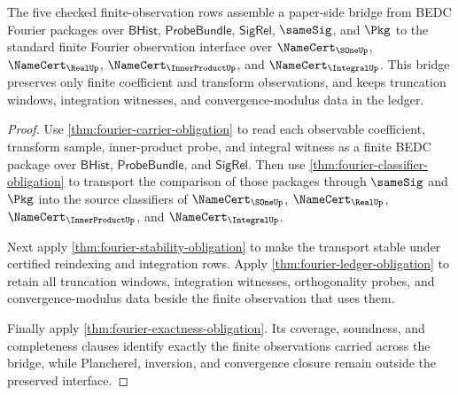 \begin{theorem}\label{thm:fourier-finite-observation-standard-bridge}
The five checked finite-observation rows assemble a paper-side bridge from BEDC Fourier packages over $\mathsf{BHist}$, $\mathsf{ProbeBundle}$, $\mathsf{SigRel}$, $\sameSig$, and $\Pkg$ to the standard finite Fourier observation interface over $\NameCert_{\SOneUp}$, $\NameCert_{\RealUp}$, $\NameCert_{\InnerProductUp}$, and $\NameCert_{\IntegralUp}$. This bridge preserves only finite coefficient and transform observations, and keeps truncation windows, integration witnesses, and convergence-modulus data in the ledger.
\end{theorem}
\begin{proof}
Use \autoref{thm:fourier-carrier-obligation} to read each observable coefficient, transform sample, inner-product probe, and integral witness as a finite BEDC package over $\mathsf{BHist}$, $\mathsf{ProbeBundle}$, and $\mathsf{SigRel}$. Then use \autoref{thm:fourier-classifier-obligation} to transport the comparison of those packages through $\sameSig$ and $\Pkg$ into the source classifiers of $\NameCert_{\SOneUp}$, $\NameCert_{\RealUp}$, $\NameCert_{\InnerProductUp}$, and $\NameCert_{\IntegralUp}$.

Next apply \autoref{thm:fourier-stability-obligation} to make the transport stable under certified reindexing and integration rows. Apply \autoref{thm:fourier-ledger-obligation} to retain all truncation windows, integration witnesses, orthogonality probes, and convergence-modulus data beside the finite observation that uses them.

Finally apply \autoref{thm:fourier-exactness-obligation}. Its coverage, soundness, and completeness clauses identify exactly the finite observations carried across the bridge, while Plancherel, inversion, and convergence closure remain outside the preserved interface.
\end{proof}

